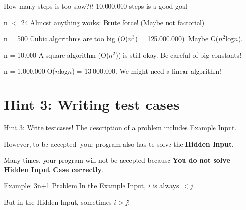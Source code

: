 \begin{frame}{How many steps is too slow?}{$lt$ 10.000.000 steps is a good goal}

  \begin{block}{n $<$ 24}
    Almost anything works: Brute force! (Maybe not factorial)
  \end{block}

  \begin{block}{n = 500}
    Cubic algorithms are too big (O($n^3$) = 125.000.000).
    Maybe O($n^2\text{log}n$).
  \end{block}

  \begin{block}{n = 10.000}
    A square algorithm (O($n^2$)) is still okay. Be careful of big constants!
  \end{block}

  \begin{block}{n = 1.000.000}
    O($n$log$n$) = 13.000.000. We might need a linear algorithm!
  \end{block}
\end{frame}



\section{Hint 3: Writing test cases}

\begin{frame}{Hint 3: Write testcases!}
  The description of a problem includes \alert{Example Input}.\bigskip

  However, to be accepted, your program also has to solve the {\bf Hidden Input}.\bigskip

  Many times, your program will not be accepted because {\bf You do not solve Hidden Input Case correctly}.

  \begin{exampleblock}{Example: 3n+1 Problem}
    In the Example Input, $i$ is always $< j$.\medskip

    But in the Hidden Input, sometimes $i > j$!\medskip
  \end{exampleblock}
\end{frame}


